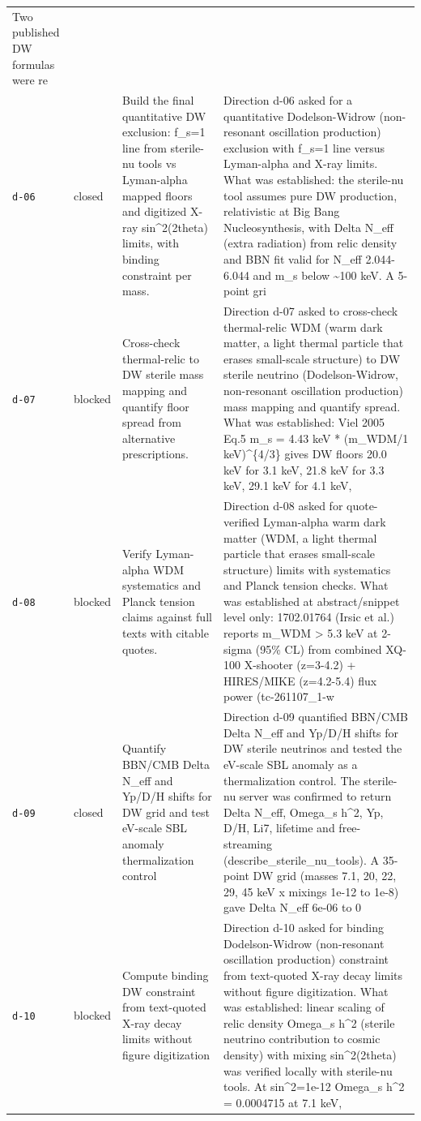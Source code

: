 \documentclass[11pt,a4paper]{article}
\begin{document}
\begin{longtable}{@{}p{}p{}p{}p{}@{}}
Two published DW formulas were re \\
\texttt{d-06} & closed & Build the final quantitative DW exclusion: f\_s=1 line from sterile-nu tools vs Lyman-alpha mapped floors and digitized X-ray sin\textasciicircum{}2(2theta) limits, with binding constraint per mass. & Direction d-06 asked for a quantitative Dodelson-Widrow (non-resonant oscillation production) exclusion with f\_s=1 line versus Lyman-alpha and X-ray limits. What was established: the sterile-nu tool assumes pure DW production, relativistic at Big Bang Nucleosynthesis, with Delta N\_eff (extra radiation) from relic density and BBN fit valid for N\_eff 2.044-6.044 and m\_s below \textasciitilde{}100 keV. A 5-point gri \\
\texttt{d-07} & blocked & Cross-check thermal-relic to DW sterile mass mapping and quantify floor spread from alternative prescriptions. & Direction d-07 asked to cross-check thermal-relic WDM (warm dark matter, a light thermal particle that erases small-scale structure) to DW sterile neutrino (Dodelson-Widrow, non-resonant oscillation production) mass mapping and quantify spread. What was established: Viel 2005 Eq.5 m\_s = 4.43 keV * (m\_WDM/1 keV)\textasciicircum{}\{4/3\} gives DW floors 20.0 keV for 3.1 keV, 21.8 keV for 3.3 keV, 29.1 keV for 4.1 keV, \\
\texttt{d-08} & blocked & Verify Lyman-alpha WDM systematics and Planck tension claims against full texts with citable quotes. & Direction d-08 asked for quote-verified Lyman-alpha warm dark matter (WDM, a light thermal particle that erases small-scale structure) limits with systematics and Planck tension checks. What was established at abstract/snippet level only: 1702.01764 (Irsic et al.) reports m\_WDM \textgreater{} 5.3 keV at 2-sigma (95\% CL) from combined XQ-100 X-shooter (z=3-4.2) + HIRES/MIKE (z=4.2-5.4) flux power (tc-261107\_1-w \\
\texttt{d-09} & closed & Quantify BBN/CMB Delta N\_eff and Yp/D/H shifts for DW grid and test eV-scale SBL anomaly thermalization control & Direction d-09 quantified BBN/CMB Delta N\_eff and Yp/D/H shifts for DW sterile neutrinos and tested the eV-scale SBL anomaly as a thermalization control. The sterile-nu server was confirmed to return Delta N\_eff, Omega\_s h\textasciicircum{}2, Yp, D/H, Li7, lifetime and free-streaming (describe\_sterile\_nu\_tools). A 35-point DW grid (masses 7.1, 20, 22, 29, 45 keV x mixings 1e-12 to 1e-8) gave Delta N\_eff 6e-06 to 0 \\
\texttt{d-10} & blocked & Compute binding DW constraint from text-quoted X-ray decay limits without figure digitization & Direction d-10 asked for binding Dodelson-Widrow (non-resonant oscillation production) constraint from text-quoted X-ray decay limits without figure digitization. What was established: linear scaling of relic density Omega\_s h\textasciicircum{}2 (sterile neutrino contribution to cosmic density) with mixing sin\textasciicircum{}2(2theta) was verified locally with sterile-nu tools. At sin\textasciicircum{}2=1e-12 Omega\_s h\textasciicircum{}2 = 0.0004715 at 7.1 keV,  \\

\end{longtable}
\end{document}
